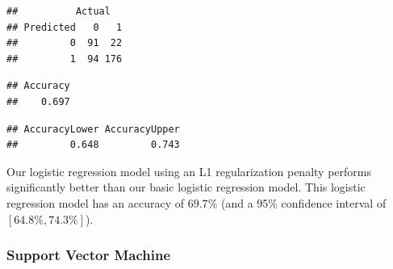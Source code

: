 \documentclass[12pt]{article}
\newenvironment{Shaded}{\begin{snugshade}}{\end{snugshade}}
\newcommand{\CommentTok}[1]{\textcolor[rgb]{0.56,0.35,0.01}{\textit{#1}}}
\newcommand{\DataTypeTok}[1]{\textcolor[rgb]{0.13,0.29,0.53}{#1}}
\newcommand{\DecValTok}[1]{\textcolor[rgb]{0.00,0.00,0.81}{#1}}
\newcommand{\KeywordTok}[1]{\textcolor[rgb]{0.13,0.29,0.53}{\textbf{#1}}}
\newcommand{\NormalTok}[1]{#1}
\newcommand{\OperatorTok}[1]{\textcolor[rgb]{0.81,0.36,0.00}{\textbf{#1}}}
\newcommand{\StringTok}[1]{\textcolor[rgb]{0.31,0.60,0.02}{#1}}
\begin{document}
\begin{Shaded}
\end{Shaded}

\begin{verbatim}
##          Actual
## Predicted   0   1
##         0  91  22
##         1  94 176
\end{verbatim}

\begin{Shaded}
\end{Shaded}

\begin{verbatim}
## Accuracy 
##    0.697
\end{verbatim}

\begin{Shaded}
\end{Shaded}

\begin{verbatim}
## AccuracyLower AccuracyUpper 
##         0.648         0.743
\end{verbatim}

Our logistic regression model using an L1 regularization penalty
performs significantly better than our basic logistic regression model.
This logistic regression model has an accuracy of \(69.7\%\) (and a 95\%
confidence interval of \([64.8\%, 74.3\%]\)).

\hypertarget{support-vector-machine}{%
\subsubsection{Support Vector Machine}\label{support-vector-machine}}
\end{document}
